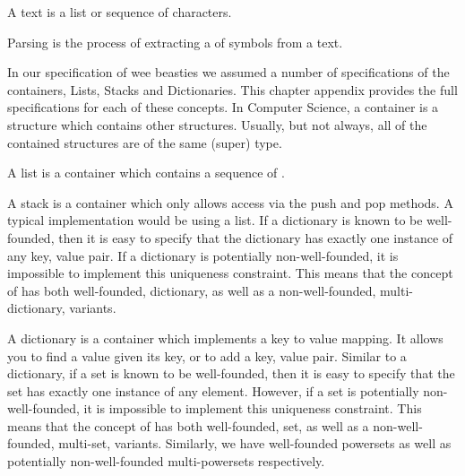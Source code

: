 A text is a list or sequence of characters.

\subChapterAppendix[title=Parsing, reference=parsingSpec]

Parsing is the process of extracting a  of symbols from 
a text. 

\chapterAppendix[title=Containers]

In our specification of wee beasties we assumed a number of specifications 
of the containers, Lists, Stacks and Dictionaries. This chapter appendix 
provides the full specifications for each of these concepts. In Computer 
Science, a container is a structure which contains other structures. 
Usually, but not always, all of the contained structures are of the same 
(super) type. 

\subChapterAppendix[title=Lists, reference=listSpec]

A list is a container which contains a sequence of \lols.

\subChapterAppendix[title=Stacks, reference=stackSpec]

A stack is a container which only allows access via the push and pop 
methods. A typical implementation would be using a list. If a dictionary 
is known to be well-founded, then it is easy to specify that the 
dictionary has exactly one instance of any key, value pair. If a 
dictionary is potentially non-well-founded, it is impossible to implement 
this uniqueness constraint. This means that the concept of 
 has both well-founded, dictionary, as well as a 
non-well-founded, multi-dictionary, variants. 

\subChapterAppendix[title=Dictionaries, reference=dictionarySpec]

A dictionary is a container which implements a key to value mapping. It 
allows you to find a value given its key, or to add a key, value pair. 
Similar to a dictionary, if a set is known to be well-founded, then it is 
easy to specify that the set has exactly one instance of any element. 
However, if a set is potentially non-well-founded, it is impossible to 
implement this uniqueness constraint. This means that the concept of 
 has both well-founded, set, as well as a non-well-founded, 
multi-set, variants. Similarly, we have well-founded powersets as well as 
potentially non-well-founded multi-powersets respectively. 

\subChapterAppendix[title={Sets and Power Sets}, reference=setSpec]

\stopChapterAppendices
